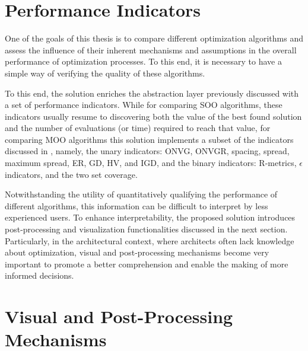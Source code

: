  
\section{Performance Indicators}
One of the goals of this thesis is to compare different optimization algorithms and assess the influence of their inherent mechanisms and assumptions in the overall performance of optimization processes. To this end, it is necessary to have a simple way of verifying the quality of these algorithms. 

To this end, the solution enriches the abstraction layer previously discussed with a set of performance indicators. While for comparing \ac{SOO} algorithms, these indicators usually resume to discovering both the value of the best found solution and the number of evaluations (or time) required to reach that value, for comparing \ac{MOO} algorithms this solution implements a subset of the indicators discussed in , namely, the unary indicators: \ac{ONVG}, \ac{ONVGR}, spacing, spread, maximum spread, \ac{ER}, \ac{GD}, \ac{HV}, and \ac{IGD}, and the binary indicators: R-metrics, $\epsilon$ indicators, and the two set coverage.

Notwithstanding the utility of quantitatively qualifying the performance of different algorithms, this information can be difficult to interpret by less experienced users. To enhance interpretability, the proposed solution introduces post-processing and visualization functionalities discussed in the next section. Particularly, in the architectural context, where architects often lack knowledge about optimization, visual and post-processing mechanisms become very important to promote a better comprehension and enable the making of more informed decisions. 

\section{Visual and Post-Processing Mechanisms}

